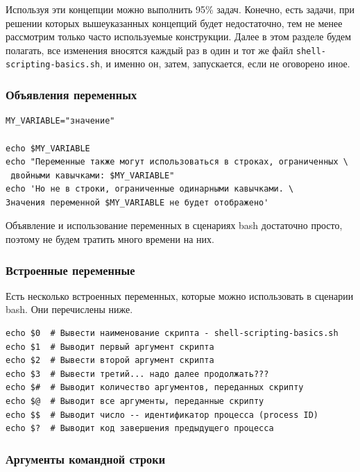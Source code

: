 \documentclass[12pt]{article}
\begin{document}
Используя эти концепции можно выполнить 95\% задач. Конечно, есть
задачи, при решении которых вышеуказанных концепций будет недостаточно,
тем не менее рассмотрим только часто используемые конструкции. Далее в
этом разделе будем полагать, все изменения вносятся каждый раз в один и тот же файл
\texttt{shell-scripting-basics.sh}, и именно он, затем, запускается, если не
оговорено иное.

\hypertarget{Variable-declarations}{%
\subsubsection{\texorpdfstring{\protect\hyperlink{Variable-declarations}{}Объявления
переменных}{Объявления переменных}}\label{Variable-declarations}}

\begin{verbatim}
MY_VARIABLE="значение"

echo $MY_VARIABLE
echo "Переменные также могут использоваться в строках, ограниченных \
 двойными кавычками: $MY_VARIABLE"
echo 'Но не в строки, ограниченные одинарными кавычками. \
Значения переменной $MY_VARIABLE не будет отображено'
\end{verbatim}
Объявление и использование переменных в сценариях bash достаточно
просто, поэтому не будем тратить много времени на них.

\hypertarget{Built-In-Variables}{%
\subsubsection{\texorpdfstring{\protect\hyperlink{Built-In-Variables}{}Встроенные
переменные}{Встроенные переменные}}\label{Built-In-Variables}}

Есть несколько встроенных переменных, которые можно использовать в
сценарии bash. Они перечислены ниже.

\begin{verbatim}
echo $0  # Вывести наименование скрипта - shell-scripting-basics.sh
echo $1  # Выводит первый аргумент скрипта
echo $2  # Вывести второй аргумент скрипта
echo $3  # Вывести третий... надо далее продолжать???
echo $#  # Выводит количество аргументов, переданных скрипту
echo $@  # Выводит все аргументы, переданные скрипту
echo $$  # Выводит число -- идентификатор процесса (process ID)
echo $?  # Выводит код завершения предыдущего процесса
\end{verbatim}

\hypertarget{Command-Line-Arguments}{%
\subsubsection{\texorpdfstring{\protect\hyperlink{Command-Line-Arguments}{}Аргументы
командной
строки}{Аргументы командной строки}}\label{Command-Line-Arguments}}
\end{document}
